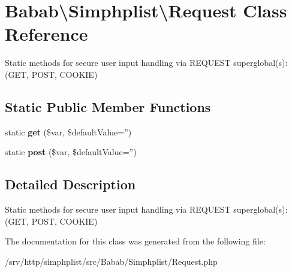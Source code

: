 \hypertarget{classBabab_1_1Simphplist_1_1Request}{\section{Babab\textbackslash{}Simphplist\textbackslash{}Request Class Reference}
\label{classBabab_1_1Simphplist_1_1Request}
}


Static methods for secure user input handling via R\+E\+Q\+U\+E\+S\+T superglobal(s)\+: (G\+E\+T, P\+O\+S\+T, C\+O\+O\+K\+I\+E)  


\subsection*{Static Public Member Functions}
\begin{DoxyCompactItemize}
\item 
\hypertarget{classBabab_1_1Simphplist_1_1Request_a3516c95fe4531c57e099e447749a5202}{static {\bfseries get} (\$var, \$default\+Value='')}\label{classBabab_1_1Simphplist_1_1Request_a3516c95fe4531c57e099e447749a5202}

\item 
\hypertarget{classBabab_1_1Simphplist_1_1Request_a0d5005e76b41f9515493e77845555078}{static {\bfseries post} (\$var, \$default\+Value='')}\label{classBabab_1_1Simphplist_1_1Request_a0d5005e76b41f9515493e77845555078}

\end{DoxyCompactItemize}


\subsection{Detailed Description}
Static methods for secure user input handling via R\+E\+Q\+U\+E\+S\+T superglobal(s)\+: (G\+E\+T, P\+O\+S\+T, C\+O\+O\+K\+I\+E) 

The documentation for this class was generated from the following file\+:\begin{DoxyCompactItemize}
\item 
/srv/http/simphplist/src/\+Babab/\+Simphplist/Request.\+php\end{DoxyCompactItemize}
